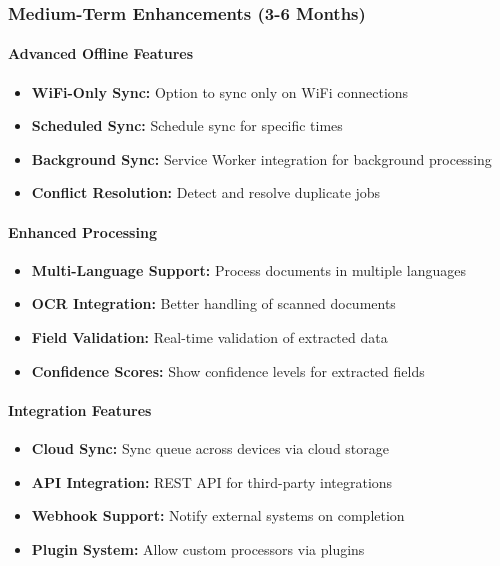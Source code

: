 \documentclass[11pt, a4paper]{article}
\theoremstyle{plain}
\theoremstyle{definition}
\begin{document}
\subsubsection{Medium-Term Enhancements (3-6 Months)}

\paragraph{Advanced Offline Features}
\begin{itemize}
    \item \textbf{WiFi-Only Sync:} Option to sync only on WiFi connections
    \item \textbf{Scheduled Sync:} Schedule sync for specific times
    \item \textbf{Background Sync:} Service Worker integration for background processing
    \item \textbf{Conflict Resolution:} Detect and resolve duplicate jobs
\end{itemize}

\paragraph{Enhanced Processing}
\begin{itemize}
    \item \textbf{Multi-Language Support:} Process documents in multiple languages
    \item \textbf{OCR Integration:} Better handling of scanned documents
    \item \textbf{Field Validation:} Real-time validation of extracted data
    \item \textbf{Confidence Scores:} Show confidence levels for extracted fields
\end{itemize}

\paragraph{Integration Features}
\begin{itemize}
    \item \textbf{Cloud Sync:} Sync queue across devices via cloud storage
    \item \textbf{API Integration:} REST API for third-party integrations
    \item \textbf{Webhook Support:} Notify external systems on completion
    \item \textbf{Plugin System:} Allow custom processors via plugins
\end{itemize}
\end{document}
